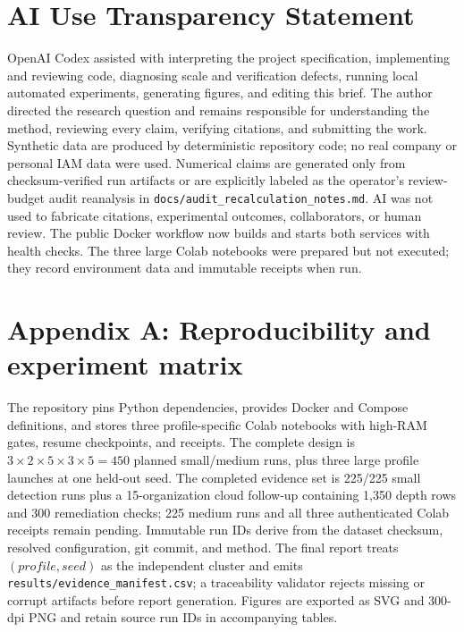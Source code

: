 \documentclass[10pt]{article}
\begin{document}
\section*{AI Use Transparency Statement}
OpenAI Codex assisted with interpreting the project specification, implementing and reviewing code, diagnosing scale and verification defects, running local automated experiments, generating figures, and editing this brief. The author directed the research question and remains responsible for understanding the method, reviewing every claim, verifying citations, and submitting the work. Synthetic data are produced by deterministic repository code; no real company or personal IAM data were used. Numerical claims are generated only from checksum-verified run artifacts or are explicitly labeled as the operator's review-budget audit reanalysis in \texttt{docs/audit\_recalculation\_notes.md}. AI was not used to fabricate citations, experimental outcomes, collaborators, or human review. The public Docker workflow now builds and starts both services with health checks. The three large Colab notebooks were prepared but not executed; they record environment data and immutable receipts when run.

\section*{Appendix A: Reproducibility and experiment matrix}
The repository pins Python dependencies, provides Docker and Compose definitions, and stores three profile-specific Colab notebooks with high-RAM gates, resume checkpoints, and receipts. The complete design is $3\times2\times5\times3\times5=450$ planned small/medium runs, plus three large profile launches at one held-out seed. The completed evidence set is 225/225 small detection runs plus a 15-organization cloud follow-up containing 1,350 depth rows and 300 remediation checks; 225 medium runs and all three authenticated Colab receipts remain pending. Immutable run IDs derive from the dataset checksum, resolved configuration, git commit, and method. The final report treats $(profile, seed)$ as the independent cluster and emits \texttt{results/evidence\_manifest.csv}; a traceability validator rejects missing or corrupt artifacts before report generation. Figures are exported as SVG and 300-dpi PNG and retain source run IDs in accompanying tables.
\end{document}
